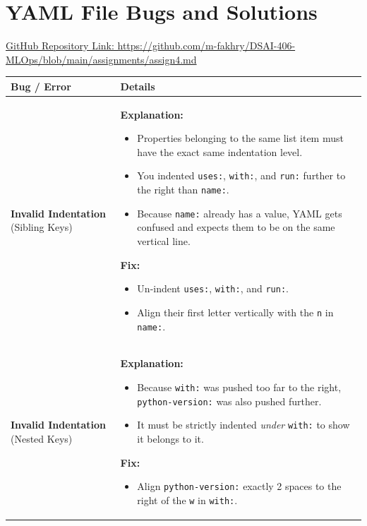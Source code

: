 \documentclass[10pt,a4paper]{article}
\begin{document}
\section*{YAML File Bugs and Solutions}
\href{https://github.com/m-fakhry/DSAI-406-MLOps/blob/main/assignments/assign4.md}{GitHub Repository Link: https://github.com/m-fakhry/DSAI-406-MLOps/blob/main/assignments/assign4.md}
\vspace{1em}

\renewcommand{\arraystretch}{1.5}
\noindent
\begin{tabularx}{\textwidth}{|>{\raggedright\arraybackslash}p{3cm}|X|}
\hline
\rowcolor{gray!20}
\textbf{Bug / Error} & \textbf{Details} \\
\hline
\textbf{Invalid Indentation} (Sibling Keys) & \textbf{Explanation:} \begin{itemize} \item Properties belonging to the same list item must have the exact same indentation level. \item You indented \texttt{uses:}, \texttt{with:}, and \texttt{run:} further to the right than \texttt{name:}. \item Because \texttt{name:} already has a value, YAML gets confused and expects them to be on the same vertical line. \end{itemize} \textbf{Fix:} \begin{itemize} \item Un-indent \texttt{uses:}, \texttt{with:}, and \texttt{run:}. \item Align their first letter vertically with the \texttt{n} in \texttt{name:}. \end{itemize} \\
\hline
\textbf{Invalid Indentation} (Nested Keys) & \textbf{Explanation:} \begin{itemize} \item Because \texttt{with:} was pushed too far to the right, \texttt{python-version:} was also pushed further. \item It must be strictly indented \textit{under} \texttt{with:} to show it belongs to it. \end{itemize} \textbf{Fix:} \begin{itemize} \item Align \texttt{python-version:} exactly 2 spaces to the right of the \texttt{w} in \texttt{with:}. \end{itemize} \\
\hline

\end{tabularx}
\end{document}
